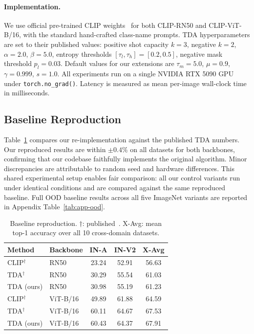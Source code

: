 \documentclass[10pt,twocolumn,letterpaper]{article}
\begin{document}
\paragraph{Implementation.}
We use official pre-trained CLIP weights~\cite{radford2021clip} for
both CLIP-RN50 and CLIP-ViT-B/16, with the standard hand-crafted
class-name prompts.
TDA hyperparameters are set to their published values:
positive shot capacity $k{=}3$, negative $k{=}2$,
$\alpha{=}2.0$, $\beta{=}5.0$,
entropy thresholds $[\tau_l, \tau_h]{=}[0.2, 0.5]$,
negative mask threshold $p_l{=}0.03$.
Default values for our extensions are
$\tau_m{=}5.0$, $\mu{=}0.9$, $\gamma{=}0.999$, $s{=}1.0$.
All experiments run on a single NVIDIA RTX 5090 GPU under
\texttt{torch.no\_grad()}.
Latency is measured as mean per-image wall-clock time in milliseconds.

\subsection{Baseline Reproduction}
\label{subsec:repro}

Table~\ref{tab:repro} compares our re-implementation against the
published TDA numbers.
Our reproduced results are within $\pm0.4\%$ on all datasets for
both backbones, confirming that our codebase faithfully implements
the original algorithm.
Minor discrepancies are attributable to random seed and hardware
differences.
This shared experimental setup enables fair comparison: all our
control variants run under identical conditions and are compared
against the same reproduced baseline.
Full OOD baseline results across all five ImageNet variants are
reported in Appendix Table~\ref{tab:app-ood}.

\begin{table}[t]
\centering\small\setlength{\tabcolsep}{4pt}
\caption{Baseline reproduction. $\dagger$: published~\cite{karmanov2024tda}.
  X-Avg: mean top-1 accuracy over all 10 cross-domain datasets.}
\label{tab:repro}
\begin{tabular}{llccc}
\toprule
Method & Backbone & IN-A & IN-V2 & X-Avg \\
\midrule
CLIP$^\dagger$  & RN50     & 23.24 & 52.91 & 56.63 \\
TDA$^\dagger$   & RN50     & 30.29 & 55.54 & 61.03 \\
TDA (ours)      & RN50     & 30.98 & 55.19 & 61.23 \\
\midrule
CLIP$^\dagger$  & ViT-B/16 & 49.89 & 61.88 & 64.59 \\
TDA$^\dagger$   & ViT-B/16 & 60.11 & 64.67 & 67.53 \\
TDA (ours)      & ViT-B/16 & 60.43 & 64.37 & 67.91 \\
\bottomrule
\end{tabular}
\end{table}
\end{document}
